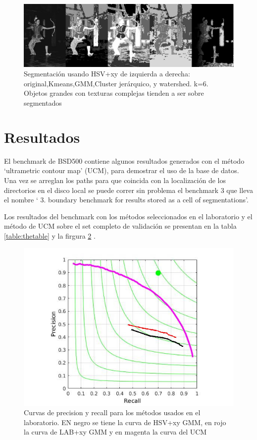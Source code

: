 \documentclass[10pt,twocolumn,letterpaper]{article}
\begin{document}
\begin{figure}
\begin{center}
\includegraphics[width=0.95\linewidth]
                {img/woman.jpg}
\end{center}
\caption{Segmentación usando HSV+xy de izquierda a derecha: original,Kmeans,GMM,Cluster jerárquico, y watershed. k=6. Objetos grandes con texturas complejas tienden a ser sobre segmentados}
\label{fig:woman}
\end{figure}


\section{Resultados}

El benchmark de BSD500 contiene algunos resultados generados con el método ‘ultrametric contour map’ (UCM), para demostrar el uso de la base de datos. Una vez se arreglan los paths para que coincida con la localización de los directorios en el disco local se puede correr sin problema el benchmark 3 que lleva el nombre ‘ 3. boundary benchmark for results stored as a cell of segmentations’.

Los resultados del benchmark con los métodos seleccionados en el laboratorio y el método de UCM sobre el set completo de validación se presentan en la tabla \ref{table:thetable} y la firgura \ref{fig:plot} .


\begin{figure}
\begin{center}
\includegraphics[width=1.15\linewidth]
                {img/metods.jpg}
\end{center}
\caption{Curvas de precision y recall para los métodos usados en el laboratorio. EN negro se tiene la curva de HSV+xy GMM, en rojo la curva de LAB+xy GMM y en magenta la curva del UCM}
\label{fig:plot}
\end{figure}
\end{document}
